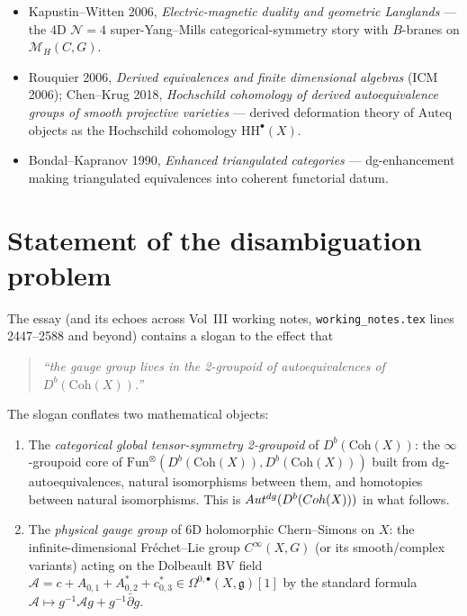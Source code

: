 \documentclass[11pt]{amsart}
\theoremstyle{definition}
\providecommand{\Coh}{\mathrm{Coh}}
\providecommand{\Auteq}{\mathrm{Auteq}}
\providecommand{\Autdg}{\mathrm{Aut}^{\rm dg}}
\providecommand{\fg}{\mathfrak{g}}
\providecommand{\cM}{\mathcal{M}}
\providecommand{\cA}{\mathcal{A}}
\begin{document}
\begin{itemize}
   (arXiv:1812.01110) --- the categorical symmetry of a holomorphic
   twist acts on branes via Fourier--Mukai modulation.
 \item Kapustin--Witten 2006, \emph{Electric-magnetic duality and
   geometric Langlands} --- the 4D $\mathcal{N} = 4$ super-Yang--Mills
   categorical-symmetry story with $B$-branes on $\cM_H(C, G)$.
 \item Rouquier 2006, \emph{Derived equivalences and finite
   dimensional algebras} (ICM 2006); Chen--Krug 2018,
   \emph{Hochschild cohomology of derived autoequivalence groups
   of smooth projective varieties}
   --- derived deformation theory of $\Auteq$ objects as
   the Hochschild cohomology $\mathrm{HH}^\bullet(X)$.
 \item Bondal--Kapranov 1990, \emph{Enhanced triangulated categories}
   --- dg-enhancement making triangulated equivalences into
   coherent functorial datum.
\end{itemize}

\section{Statement of the disambiguation problem}
\label{sec:statement}

The essay (and its echoes across Vol~III working notes,
\texttt{working\_notes.tex} lines 2447--2588 and beyond) contains a
slogan to the effect that

\begin{quote}
\textsl{``the gauge group lives in the 2-groupoid of autoequivalences
of $D^b(\Coh(X))$.''}
\end{quote}

The slogan conflates two mathematical objects:

\begin{enumerate}[label=(G\arabic*)]
 \item The \emph{categorical global tensor-symmetry 2-groupoid} of
   $D^b(\Coh(X))$: the $\infty$-groupoid core of
   $\mathrm{Fun}^\otimes(D^b(\Coh(X)), D^b(\Coh(X)))$ built from
   dg-autoequivalences, natural isomorphisms between them, and
   homotopies between natural isomorphisms. This is
   $\Autdg(D^b(\Coh(X)))$ in what follows.
 \item The \emph{physical gauge group} of 6D holomorphic
   Chern--Simons on $X$: the infinite-dimensional Fr\'echet--Lie group
   $C^\infty(X, G)$ (or its smooth/complex variants) acting on the
   Dolbeault BV field $\cA = c + A_{0,1} + A^*_{0,2} + c^*_{0,3} \in
   \Omega^{0,\bullet}(X, \fg)[1]$ by the standard formula
   $\cA \mapsto g^{-1}\cA g + g^{-1}\bar\partial g$.
\end{enumerate}
\end{document}
